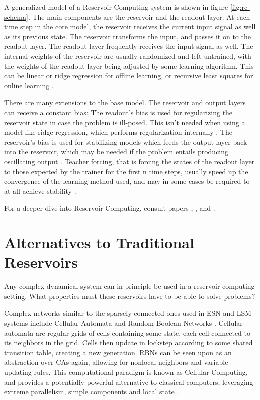 A generalized model of a Reservoir Computing system is shown in figure \ref{fig:rc-schema}.
The main components are the reservoir and the readout layer.
At each time step in the core model,
the reservoir receives the current input signal as well as its previous state.
The reservoir transforms the input, and passes it on to the readout layer.
The readout layer frequently receives the input signal as well.
The internal weights of the reservoir are usually randomized and left untrained,
with the weights of the readout layer being adjusted by some learning algorithm.
This can be linear or ridge regression for offline learning,
or recursive least squares for online learning \cite{Schrauwen2007}.

There are many extensions to the base model.
The reservoir and output layers can receive a constant bias:
The readout's bias is used for regularizing the reservoir state in case the problem is ill-posed.
This isn't needed when using a model like ridge regression, which performs regularization internally \cite{Schrauwen2007}.
The reservoir's bias is used for stabilizing models which feeds the output layer back into the reservoir,
which may be needed if the problem entails producing oscillating output \cite{Jaeger:2007}.
Teacher forcing,
that is forcing the states of the readout layer to those expected by the trainer for the first n time steps,
usually speed up the convergence of the learning method used,
and may in some cases be required to at all achieve stability \cite{jaeger2002tutorial}.

For a deeper dive into Reservoir Computing,
consult papers \cite{Schrauwen2007}, \cite{lukovsevivcius2012reservoir}, and \cite{Jaeger:2007}.

\section{Alternatives to Traditional Reservoirs}

Any complex dynamical system can in principle be used in a reservoir computing setting.
What properties must these reservoirs have to be able to solve problems?

Complex networks similar to the sparsely connected ones used in ESN and LSM systems include Cellular Automata \cite{wolfram2002new} and Random Boolean Networks \cite{kauffman1969metabolic}.
Cellular automata are regular grids of cells containing some state,
each cell connected to its neighbors in the grid.
Cells then update in lockstep according to some shared transition table,
creating a new generation.
RBNs can be seen upon as an abstraction over CAs again,
allowing for nonlocal neighbors and variable updating rules.
This computational paradigm is known as Cellular Computing,
and provides a potentially powerful alternative to classical computers,
leveraging extreme parallelism, simple components and local state \cite{sipper1999emergence}.

